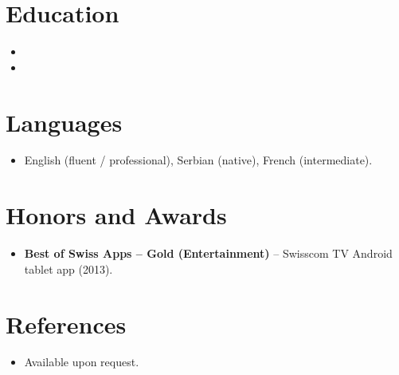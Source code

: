 \documentclass[11pt,a4paper,sans]{moderncv}
\begin{document}

\section{Education}
\vspace{1pt}
\begin{itemize}

\item{}

\vspace{3pt}

\item{}

\end{itemize}


\section{Languages}
\vspace{1pt}
\begin{itemize}
\item English (fluent / professional), Serbian (native), French (intermediate).
\end{itemize}


\section{Honors and Awards}
\vspace{1pt}
\begin{itemize}
\item{\textbf{Best of Swiss Apps -- Gold (Entertainment)} -- Swisscom TV Android tablet app (2013).}
\end{itemize}


\section{References}
\vspace{1pt}
\begin{itemize}
\item{Available upon request.}
\end{itemize}
\end{document}

